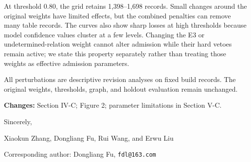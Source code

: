 At threshold 0.80, the grid retains 1,398--1,698 records. Small changes around the original weights have limited effects, but the combined penalties can remove many table records. The curves also show sharp losses at high thresholds because model confidence values cluster at a few levels. Changing the E3 or undetermined-relation weight cannot alter admission while their hard vetoes remain active; we state this property separately rather than treating those weights as effective admission parameters.

All perturbations are descriptive revision analyses on fixed build records. The original weights, thresholds, graph, and holdout evaluation remain unchanged.

\textbf{Changes:} Section IV-C; Figure 2; parameter limitations in Section V-C.

\medskip
Sincerely,\par
Xiaokun Zhang, Dongliang Fu, Rui Wang, and Erwu Liu\par
Corresponding author: Dongliang Fu, \texttt{fdl@163.com}
\endgroup
